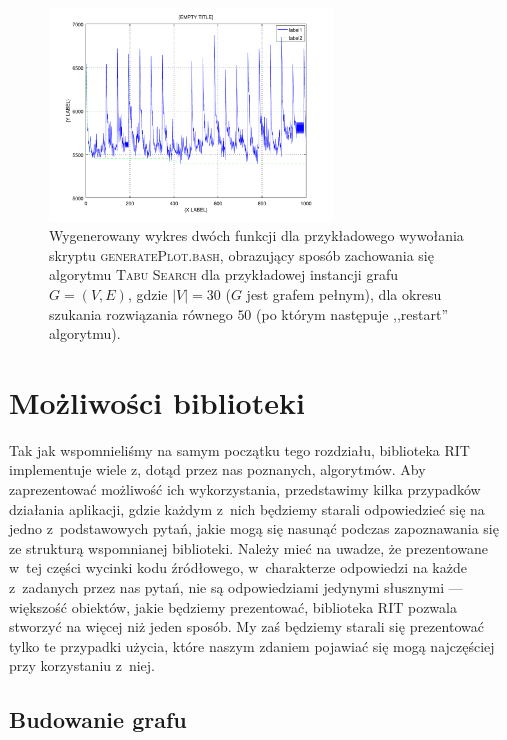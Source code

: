 \begin{figure}[!htbp]
	\renewcommand\figurename{Wykres}
	\null\hfill
	\includegraphics[width=0.67\textwidth]{Appendix_I/GENERATE-PLOT-example/1}
	\hfill\null
	\caption{
		Wygenerowany wykres dwóch funkcji dla przykładowego wywołania skryptu \textsc{generatePlot.bash}, obrazujący sposób zachowania się algorytmu \textsc{Tabu Search} dla przykładowej instancji grafu $G = \left( V, E \right)$, gdzie $\left| V \right| = 30$ ($G$ jest grafem pełnym), dla okresu szukania rozwiązania równego $50$ (po którym następuje ,,restart'' algorytmu).
	}
	\label{fig:genplot}
\end{figure}

\section{Możliwości biblioteki}

Tak jak wspomnieliśmy na samym początku tego rozdziału, biblioteka \textsc{RIT} implementuje wiele z, dotąd przez nas poznanych, algorytmów. Aby zaprezentować możliwość ich wykorzystania, przedstawimy kilka przypadków działania aplikacji, gdzie każdym z~nich będziemy starali odpowiedzieć się na jedno z~podstawowych pytań, jakie mogą się nasunąć podczas zapoznawania się ze strukturą wspomnianej biblioteki. Należy mieć na uwadze, że prezentowane w~tej części wycinki kodu źródłowego, w~charakterze odpowiedzi na każde z~zadanych przez nas pytań, nie są odpowiedziami jedynymi słusznymi --- większość obiektów, jakie będziemy prezentować, biblioteka \textsc{RIT} pozwala stworzyć na więcej niż jeden sposób. My zaś będziemy starali się prezentować tylko te przypadki użycia, które naszym zdaniem pojawiać się mogą najczęściej przy korzystaniu z~niej.

\subsection{Budowanie grafu}

